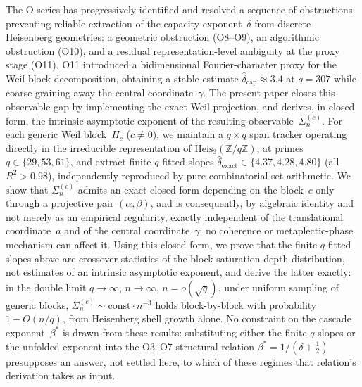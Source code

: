 The O-series has progressively identified and resolved a sequence of obstructions
preventing reliable extraction of the capacity exponent~$\delta$ from discrete Heisenberg
geometries: a geometric obstruction (O8--O9), an algorithmic obstruction (O10), and a
residual representation-level ambiguity at the proxy stage (O11).
O11 introduced a bidimensional Fourier-character proxy for the Weil-block decomposition,
obtaining a stable estimate $\hat{\delta}_{\mathrm{cap}}\approx 3.4$ at $q=307$ while
coarse-graining away the central coordinate~$\gamma$.
The present paper closes this observable gap by implementing the exact Weil projection,
and derives, in closed form, the intrinsic asymptotic exponent of the resulting
observable~$\Sigma_n^{(c)}$.
For each generic Weil block~$H_c$ ($c\neq 0$), we maintain a $q\times q$ span tracker
operating directly in the irreducible representation of $\mathrm{Heis}_3(\mathbb{Z}/q\mathbb{Z})$,
at primes $q\in\{29,53,61\}$, and extract finite-$q$ fitted slopes
$\hat{\delta}_{\mathrm{exact}}\in\{4.37,4.28,4.80\}$ (all $R^2>0.98$), independently
reproduced by pure combinatorial set arithmetic.
We show that $\Sigma_n^{(c)}$ admits an exact closed form depending on the block~$c$ only
through a projective pair $(\alpha,\beta)$, and is consequently, by algebraic identity and
not merely as an empirical regularity, exactly independent of the translational
coordinate~$a$ and of the central coordinate~$\gamma$: no coherence or metaplectic-phase
mechanism can affect it.
Using this closed form, we prove that the finite-$q$ fitted slopes above are crossover
statistics of the block saturation-depth distribution, not estimates of an intrinsic
asymptotic exponent, and derive the latter exactly: in the double limit $q\to\infty$,
$n\to\infty$, $n=o(\sqrt{q})$, under uniform sampling of generic blocks,
$\Sigma_n^{(c)}\sim\mathrm{const}\cdot n^{-3}$ holds block-by-block with probability
$1-O(n/q)$, from Heisenberg shell growth alone.
No constraint on the cascade exponent~$\beta^*$ is drawn from these results: substituting
either the finite-$q$ slopes or the unfolded exponent into the O3--O7 structural relation
$\beta^*=1/(\delta+\tfrac12)$ presupposes an answer, not settled here, to which of these
regimes that relation's derivation takes as input.
